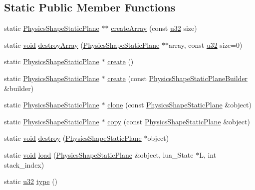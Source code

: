 \subsection*{Static Public Member Functions}
\begin{DoxyCompactItemize}
\item 
static \mbox{\hyperlink{classnjli_1_1_physics_shape_static_plane}{Physics\+Shape\+Static\+Plane}} $\ast$$\ast$ \mbox{\hyperlink{classnjli_1_1_physics_shape_static_plane_acb4c383f2673513148490879f3c44d06}{create\+Array}} (const \mbox{\hyperlink{_util_8h_a10e94b422ef0c20dcdec20d31a1f5049}{u32}} size)
\item 
static \mbox{\hyperlink{_thread_8h_af1e856da2e658414cb2456cb6f7ebc66}{void}} \mbox{\hyperlink{classnjli_1_1_physics_shape_static_plane_abbae76b7c560dde8822801fa6dceb907}{destroy\+Array}} (\mbox{\hyperlink{classnjli_1_1_physics_shape_static_plane}{Physics\+Shape\+Static\+Plane}} $\ast$$\ast$array, const \mbox{\hyperlink{_util_8h_a10e94b422ef0c20dcdec20d31a1f5049}{u32}} size=0)
\item 
static \mbox{\hyperlink{classnjli_1_1_physics_shape_static_plane}{Physics\+Shape\+Static\+Plane}} $\ast$ \mbox{\hyperlink{classnjli_1_1_physics_shape_static_plane_a79a084c8eae9c46259e7a16161a1dca6}{create}} ()
\item 
static \mbox{\hyperlink{classnjli_1_1_physics_shape_static_plane}{Physics\+Shape\+Static\+Plane}} $\ast$ \mbox{\hyperlink{classnjli_1_1_physics_shape_static_plane_a8a350cc452c42731f47a41ff0c917fda}{create}} (const \mbox{\hyperlink{classnjli_1_1_physics_shape_static_plane_builder}{Physics\+Shape\+Static\+Plane\+Builder}} \&builder)
\item 
static \mbox{\hyperlink{classnjli_1_1_physics_shape_static_plane}{Physics\+Shape\+Static\+Plane}} $\ast$ \mbox{\hyperlink{classnjli_1_1_physics_shape_static_plane_ab3f56be3f14ac6fc2afbd8a8916c811b}{clone}} (const \mbox{\hyperlink{classnjli_1_1_physics_shape_static_plane}{Physics\+Shape\+Static\+Plane}} \&object)
\item 
static \mbox{\hyperlink{classnjli_1_1_physics_shape_static_plane}{Physics\+Shape\+Static\+Plane}} $\ast$ \mbox{\hyperlink{classnjli_1_1_physics_shape_static_plane_a6cd5000f8c3d92e1e8f05c56d3bfe242}{copy}} (const \mbox{\hyperlink{classnjli_1_1_physics_shape_static_plane}{Physics\+Shape\+Static\+Plane}} \&object)
\item 
static \mbox{\hyperlink{_thread_8h_af1e856da2e658414cb2456cb6f7ebc66}{void}} \mbox{\hyperlink{classnjli_1_1_physics_shape_static_plane_aea86cd8ba2fddb802e7bb812656e4874}{destroy}} (\mbox{\hyperlink{classnjli_1_1_physics_shape_static_plane}{Physics\+Shape\+Static\+Plane}} $\ast$object)
\item 
static \mbox{\hyperlink{_thread_8h_af1e856da2e658414cb2456cb6f7ebc66}{void}} \mbox{\hyperlink{classnjli_1_1_physics_shape_static_plane_a4cf043a132670af307378d22a3044f8a}{load}} (\mbox{\hyperlink{classnjli_1_1_physics_shape_static_plane}{Physics\+Shape\+Static\+Plane}} \&object, lua\+\_\+\+State $\ast$L, int stack\+\_\+index)
\item 
static \mbox{\hyperlink{_util_8h_a10e94b422ef0c20dcdec20d31a1f5049}{u32}} \mbox{\hyperlink{classnjli_1_1_physics_shape_static_plane_a5a914f2bd547a35665e382a77d04f058}{type}} ()
\end{DoxyCompactItemize}
